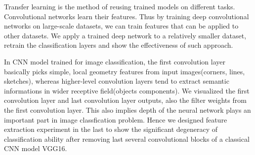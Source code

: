 Transfer learning is the method of reusing trained models on different tasks. Convolutional networks learn their features. Thus by training deep convolutional networks on large-scale datasets, we can train features that can be applied to other datasets. We apply a trained deep network to a relatively smaller dataset, retrain the classification layers and show the effectiveness of such approach.

In CNN model trained for image classification, the first convolution layer basically picks simple, local geometry features from input images(corners, lines, sketches), whereas higher-level convolution layers tend to extract semantic informations in wider receptive field(objects components). We visualized the first convolution layer and last convolution layer outputs, also the filter weights from the first convolution layer. This also implies depth of the neural network plays an important part in image classfication problem. Hence we designed feature extraction experiment in the last to show the significant degeneracy of classification ability after removing last several convolutional blocks of a classical CNN model VGG16.